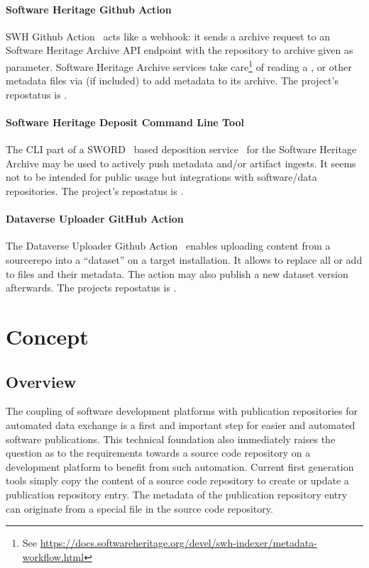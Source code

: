 \documentclass[11pt,a4paper]{scrartcl}
\begin{document}
\paragraph{Software Heritage Github Action}\label{par:workflows-swh-gh-action}
SWH Github Action~\cite{sw:swh-save-action} acts like a webhook: it sends a archive request to an Software Heritage Archive 
API endpoint with the repository to archive given as parameter.
Software Heritage Archive services take care\footnote{See \url{https://docs.softwareheritage.org/devel/swh-indexer/metadata-workflow.html}}
of reading a ,  or other metadata files via 
 (if included) to add metadata to its archive.
The project's \gls{repostatus} is .

\paragraph{Software Heritage Deposit Command Line Tool}\label{par:workflows-swh-deposit-cli}
The CLI part of a SWORD~\cite{SWORD} based deposition service~\cite{sw:swh-deposit-cli} 
for the Software Heritage Archive may be used to actively push metadata and/or artifact ingests.
It seems not to be intended for public usage but integrations with software/data repositories.
The project's \gls{repostatus} is .

\paragraph{Dataverse Uploader GitHub Action}\label{par:workflows-dataverse-action}
The Dataverse Uploader Github Action~\cite{sw:dataverse-uploader-action} enables uploading content from a \gls{sourcerepo} into
a \enquote{dataset} on a target  installation. It allows to replace all or add to files and their metadata.
The action may also publish a new dataset version afterwards. The projects \gls{repostatus} is .





\clearpage
\section{Concept}\label{sec:concept}

\subsection{Overview}\label{subsec:concept-overview}
The coupling of software development platforms with publication repositories for automated data exchange is a first and important step
for easier and automated software publications. This technical foundation also immediately raises the question as to the requirements
towards a source code repository on a development platform to benefit from such automation. Current first generation tools simply copy
the content of a source code repository to create or update a publication repository entry. The metadata of the publication repository
entry can originate from a special file in the source code repository.
\end{document}
